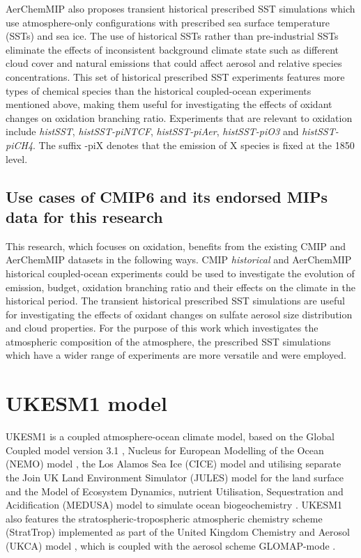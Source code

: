 AerChemMIP also proposes transient historical prescribed SST simulations which use atmosphere-only configurations with prescribed sea surface temperature (SSTs) and sea ice. The use of historical SSTs rather than pre-industrial SSTs eliminate the effects of inconsistent background climate state such as different cloud cover and natural emissions that could affect aerosol and relative species concentrations. This set of historical prescribed SST experiments features more types of chemical species than the historical coupled-ocean experiments mentioned above, making them useful for investigating the effects of oxidant changes on oxidation branching ratio. Experiments that are relevant to  oxidation include \textit{histSST}, \textit{histSST-piNTCF}, \textit{histSST-piAer}, \textit{histSST-piO3} and \textit{histSST-piCH4}. The suffix -piX denotes that the emission of X species is fixed at the 1850 level.


\subsection{Use cases of CMIP6 and its endorsed MIPs data for this research}

This research, which focuses on  oxidation, benefits from the existing CMIP and AerChemMIP datasets in the following ways. CMIP \textit{historical} and AerChemMIP historical coupled-ocean experiments could be used to investigate the evolution of  emission, budget, oxidation branching ratio and their effects on the climate in the historical period. The transient historical prescribed SST simulations are useful for investigating the effects of oxidant changes on sulfate aerosol size distribution and cloud properties.  For the purpose of this work which investigates the atmospheric composition of the atmosphere, the prescribed SST simulations which have a wider range of experiments are more versatile and were employed.

\section{UKESM1 model}  
\label{sec:1.ukesm1}
UKESM1 is a coupled atmosphere-ocean climate model, based on the Global Coupled model version 3.1 \citep[HadGEM3-GC3.1;][]{kuhlbrodtLowResolutionVersionHadGEM32018, brownUnifiedModelingPrediction2012}, Nucleus for European Modelling of the Ocean (NEMO) model \citep{storkeyUKGlobalOcean2018}, the Los Alamos Sea Ice (CICE) model \citep{ridleySeaIceModel2018} and utilising separate the Join UK Land Environment Simulator (JULES) model for the land surface \citep{bestJointUKLand2011} and the Model of Ecosystem Dynamics, nutrient Utilisation, Sequestration and Acidification (MEDUSA) model to simulate ocean biogeochemistry \citep{yoolMEDUSA2IntermediateComplexity2013}. UKESM1 also features the stratospheric-tropospheric atmospheric chemistry scheme (StratTrop) implemented as part of the United Kingdom Chemistry and Aerosol (UKCA) model \citep{archibaldDescriptionEvaluationUKCA2020}, which is coupled with the aerosol scheme GLOMAP-mode \citep{mulcahyDescriptionEvaluationAerosol2020}. 


